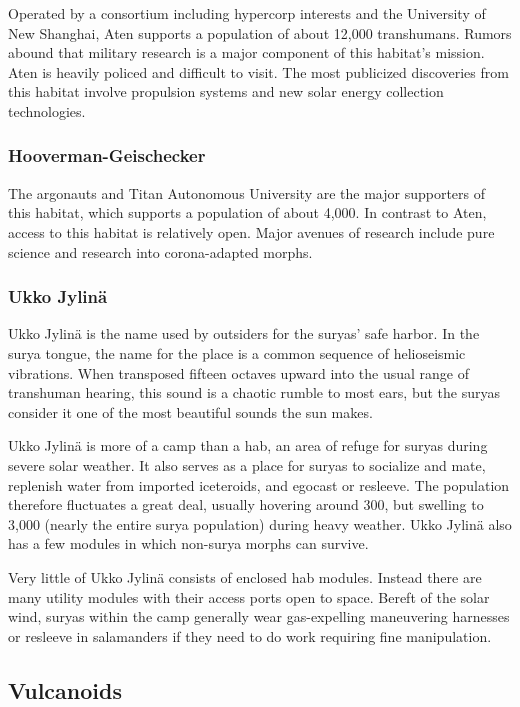 Operated by a consortium including hypercorp 
interests and the University of New Shanghai, Aten 
supports a population of about 12,000 transhumans. 
Rumors abound that military research is a major component
of this habitat's mission. Aten is heavily policed
and difficult to visit. The most publicized discoveries 
from this habitat involve propulsion systems and new 
solar energy collection technologies.

\subsubsection{Hooverman-Geischecker}

The argonauts and Titan Autonomous University are 
the major supporters of this habitat, which supports a 
population of about 4,000. In contrast to Aten, access 
to this habitat is relatively open. Major avenues of research
include pure science and research into corona-adapted
morphs.

\subsubsection{Ukko Jylinä}

Ukko Jylinä is the name used by outsiders for the 
suryas' safe harbor. In the surya tongue, the name 
for the place is a common sequence of helioseismic 
vibrations. When transposed fifteen octaves upward 
into the usual range of transhuman hearing, this 
sound is a chaotic rumble to most ears, but the 
suryas consider it one of the most beautiful sounds 
the sun makes.

Ukko Jylinä is more of a camp than a hab, an area 
of refuge for suryas during severe solar weather. It 
also serves as a place for suryas to socialize and mate, 
replenish water from imported iceteroids, and egocast 
or resleeve. The population therefore fluctuates  a 
great deal, usually hovering around 300, but swelling 
to 3,000 (nearly the entire surya population) during 
heavy weather. Ukko Jylinä also has a few modules in 
which non-surya morphs can survive.

Very little of Ukko Jylinä consists of enclosed hab 
modules. Instead there are many utility modules with 
their access ports open to space. Bereft of the solar 
wind, suryas within the camp generally wear gas-expelling
maneuvering harnesses or resleeve in salamanders
if they need to do work requiring fine manipulation.

\subsection{Vulcanoids}

